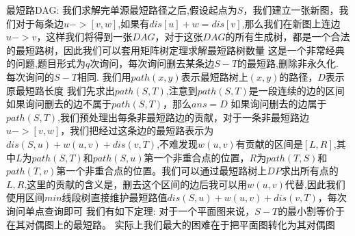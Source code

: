 {}最短路DAG:\markdownRendererParagraphSeparator
{}我们求解完单源最短路径之后,假设起点为$ S $，我们建立一张新图，我们对于每条边$ u->[v,w] $,如果有$ dis[u]+w=dis[v] $,那么我们在新图上连边$ u->v $，这样我们将得到一张$ DAG $，对于这张$ DAG $的所有生成树，都是一个合法的最短路树，因此我们可以套用矩阵树定理求解最短路树数量\markdownRendererInterblockSeparator
{}
\markdownRendererSectionEnd \markdownRendererSectionBegin
{}\markdownRendererInterblockSeparator
{}这是一个非常经典的问题,题目形式为$ q $次询问，每次询问删去某条边$ S-T $的最短路,删除非永久化.\markdownRendererParagraphSeparator
{}每次询问的$ S-T $相同.\markdownRendererParagraphSeparator
{}我们用$ path(x,y) $表示最短路树上$ (x,y) $的路径，$ D $表示原最短路长度\markdownRendererParagraphSeparator
{}我们先求出$ path(S,T) $,注意到$ path(S,T) $是一段连续的边的区间\markdownRendererParagraphSeparator
{}如果询问删去的边不属于$ path(S,T) $，那么$ ans=D $\markdownRendererParagraphSeparator
{}如果询问删去的边属于$ path(S,T) $,我们预处理出每条非最短路边的贡献，对于一条非最短路边$ u->[v,w] $，我们把经过这条边的最短路表示为$ dis(S,u)+w(u,v)+dis(v,T) $,不难发现$ w(u,v) $有贡献的区间是$ [L,R] $,其中$ L $为$ path(S,T) $和$ path(S,u) $第一个非重合点的位置，$ R $为$ path(T,S) $和$ path(T,v) $第一个非重合点的位置。我们可以通过最短路树上$ DP $求出所有点的$ L,R $,这里的贡献的含义是，删去这个区间的边后我可以用$ w(u,v) $代替,因此我们使用区间$ min $线段树直接维护最短路值$ dis(S,u)+w(u,v)+dis(v,T) $，每次询问单点查询即可\markdownRendererInterblockSeparator
{}\markdownRendererInterblockSeparator
{}
\markdownRendererSectionEnd \markdownRendererSectionBegin
{}\markdownRendererInterblockSeparator
{}我们有如下定理:\markdownRendererParagraphSeparator
{}对于一个平面图来说，$ S-T $的最小割等价于在其对偶图上的最短路。\markdownRendererParagraphSeparator
{}实际上我们最大的困难在于把平面图转化为其对偶图\markdownRendererInterblockSeparator
{}
\markdownRendererSectionEnd \markdownRendererSectionBegin
{}\markdownRendererInterblockSeparator
